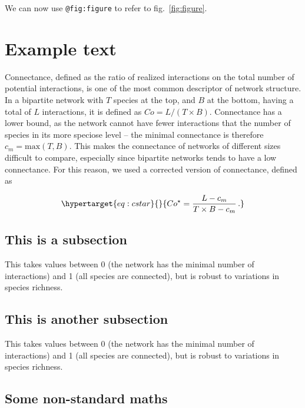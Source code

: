 \documentclass[10pt,oneside]{article}
\begin{document}
We can now use \texttt{@fig:figure} to refer to fig.~\ref{fig:figure}.

\hypertarget{example-text}{%
\section{Example text}\label{example-text}}

Connectance, defined as the ratio of realized interactions on the total
number of potential interactions, is one of the most common descriptor
of network structure. In a bipartite network with \(T\) species at the
top, and \(B\) at the bottom, having a total of \(L\) interactions, it
is defined as \(Co = L/(T\times B)\). Connectance has a lower bound, as
the network cannot have fewer interactions that the number of species in
its more speciose level -- the minimal connectance is therefore
\(c_m = \text{max}(T,B)\). This makes the connectance of networks of
different sizes difficult to compare, especially since bipartite
networks tends to have a low connectance. For this reason, we used a
corrected version of connectance, defined as

\begin{equation}\protect\hypertarget{eq:cstar}{}{Co^\star=\frac{L-c_m}{T\times B-c_m} \,.}\label{eq:cstar}\end{equation}

\hypertarget{this-is-a-subsection}{%
\subsection{This is a subsection}\label{this-is-a-subsection}}

This takes values between 0 (the network has the minimal number of
interactions) and 1 (all species are connected), but is robust to
variations in species richness.

\hypertarget{this-is-another-subsection}{%
\subsection{This is another
subsection}\label{this-is-another-subsection}}

This takes values between 0 (the network has the minimal number of
interactions) and 1 (all species are connected), but is robust to
variations in species richness.

\hypertarget{some-non-standard-maths}{%
\subsection{Some non-standard maths}\label{some-non-standard-maths}}
\end{document}
